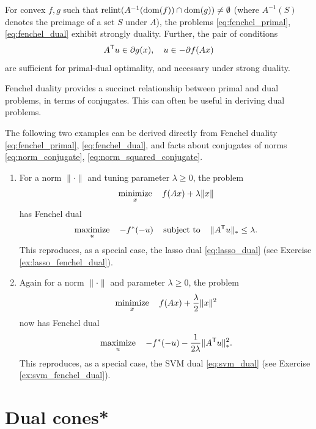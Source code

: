 \begin{Corollary}
\label{cor:fenchel_dual}
For convex $f,g$ such that $\operatorname{relint}(A^{-1}(\operatorname{dom}(f)) \cap \operatorname{dom}(g)) \not=
\emptyset$ (where $A^{-1}(S)$ denotes the preimage of a set $S$ under $A$), the
problems \eqref{eq:fenchel_primal}, \eqref{eq:fenchel_dual} exhibit strongly 
duality. Further, the pair of conditions
\[
A^{\mathsf{T}} u \in \partial g(x), \quad u \in - \partial f(Ax)
\]
are sufficient for primal-dual optimality, and necessary under strong duality.   
\end{Corollary}

Fenchel duality provides a succinct relationship between primal and dual
problems, in terms of conjugates. This can often be useful in deriving dual
problems.

\begin{Example}
The following two examples can be derived directly from Fenchel duality
\eqref{eq:fenchel_primal}, \eqref{eq:fenchel_dual}, and facts about conjugates
of norms \eqref{eq:norm_conjugate}, \eqref{eq:norm_squared_conjugate}.

\begin{enumerate}[label=\alph*., ref=\alph*]
\item {}
For a norm $\|\cdot\|$ and tuning parameter $\lambda \geq 0$, the problem    
\[
\operatorname*{minimize}_x \quad f(Ax) + \lambda \|x\| 
\]
has Fenchel dual 
\[
\operatorname*{maximize}_u \quad -f^*(-u) \quad \operatorname{subject\,\,to} \quad \|A^{\mathsf{T}} u\|_* \leq \lambda.        
\]
This reproduces, as a special case, the lasso dual \eqref{eq:lasso_dual} (see
Exercise \ref{ex:lasso_fenchel_dual}). 

\item {}
Again for a norm $\|\cdot\|$ and parameter $\lambda \geq 0$, the problem   
\[
\operatorname*{minimize}_x \quad f(Ax) + \frac{\lambda}{2} \|x\|^2
\]
now has Fenchel dual 
\[
\operatorname*{maximize}_u \quad -f^*(-u) - \frac{1}{2\lambda} \|A^{\mathsf{T}} u\|_*^2. 
\]
This reproduces, as a special case, the SVM dual \eqref{eq:svm_dual} (see
Exercise \ref{ex:svm_fenchel_dual}). 
\end{enumerate}
\end{Example}

\section{Dual cones*}
\label{sec:dual_cones}

